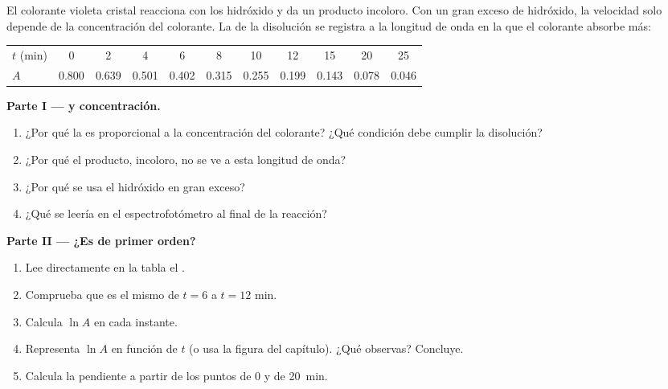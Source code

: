 \begin{problem}
\label{pb:g12:reaction-rates:1}
El colorante violeta cristal reacciona con los  hidróxido y da un
producto incoloro. Con un gran exceso de hidróxido, la velocidad solo
depende de la concentración del colorante. La  de la
disolución se registra a la longitud de onda en la que el colorante
absorbe más:
\begin{center}
\small
\begin{tabular}{l*{10}{c}}
\hline
$t$ (\si{min}) & 0 & 2 & 4 & 6 & 8 & 10 & 12 & 15 & 20 & 25 \\
$A$ & 0.800 & 0.639 & 0.501 & 0.402 & 0.315 & 0.255 & 0.199 & 0.143 &
0.078 & 0.046 \\
\hline
\end{tabular}
\end{center}

\medskip
\noindent\textbf{Parte I ---  y concentración.}
\begin{enumerate}
  \item ¿Por qué la  es proporcional a la concentración del
        colorante? ¿Qué condición debe cumplir la disolución?
  \item ¿Por qué el producto, incoloro, no se ve a esta longitud de onda?
  \item ¿Por qué se usa el hidróxido en gran exceso?
  \item ¿Qué se leería en el espectrofotómetro al final de la reacción?
\end{enumerate}

\medskip
\noindent\textbf{Parte II --- ¿Es de primer orden?}
\begin{enumerate}[resume]
  \item Lee directamente en la tabla el .
  \item Comprueba que es el mismo de $t = 6$ a $t = 12$ min.
  \item Calcula $\ln A$ en cada instante.
  \item Representa $\ln A$ en función de $t$ (o usa la figura del
        capítulo). ¿Qué observas? Concluye.
  \item Calcula la pendiente a partir de los puntos de 0 y de
        \qty{20}{min}.
\end{enumerate}


\end{problem}
